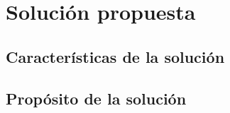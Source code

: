 \section{Solución propuesta}
\label{sec:solucion_propuesta}

\subsection{Características de la solución}
\label{subsec:caracteristicas-solucion}

\subsection{Propósito de la solución}
\label{subsec:proposito-solucion}